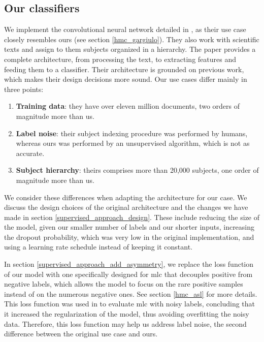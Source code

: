 \subsection{Our classifiers} \label{supervised_approach_models}

We implement the convolutional neural network detailed in \cite{gargiulo2019deep}, as their use case closely resembles ours (see section \ref{hmc_gargiulo}). They also work with scientific texts and assign to them subjects organized in a hierarchy. The paper provides a complete architecture, from processing the text, to extracting features and feeding them to a classifier. Their architecture is grounded on previous work, which makes their design decisions more sound. Our use cases differ mainly in three points:

\begin{enumerate}
    \item \textbf{Training data}: they have over eleven million documents, two orders of magnitude more than us.
    \item \textbf{Label noise}: their subject indexing procedure was performed by humans, whereas ours was performed by an unsupervised algorithm, which is not as accurate.
    \item \textbf{Subject hierarchy}: theirs comprises more than 20,000 subjects, one order of magnitude more than us.
\end{enumerate}

We consider these differences when adapting the architecture for our case. We discuss the design choices of the original architecture and the changes we have made in section \ref{supervised_approach_design}. These include reducing the size of the model, given our smaller number of labels and our shorter inputs, increasing the dropout probability, which was very low in the original implementation, and using a learning rate schedule instead of keeping it constant.

In section \ref{supervised_approach_add_asymmetry}, we replace the loss function of our model with one specifically designed for \acrfull{mlc} \cite{ben2020asymmetric} that decouples positive from negative labels, which allows the model to focus on the rare positive samples instead of on the numerous negative ones. See section \ref{hmc_asl} for more details. This loss function was used in \cite{zhao2021evaluating} to evaluate \acrshort{mlc} with noisy labels, concluding that it increased the regularization of the model, thus avoiding overfitting the noisy data. Therefore, this loss function may help us address label noise, the second difference between the original use case and ours.

